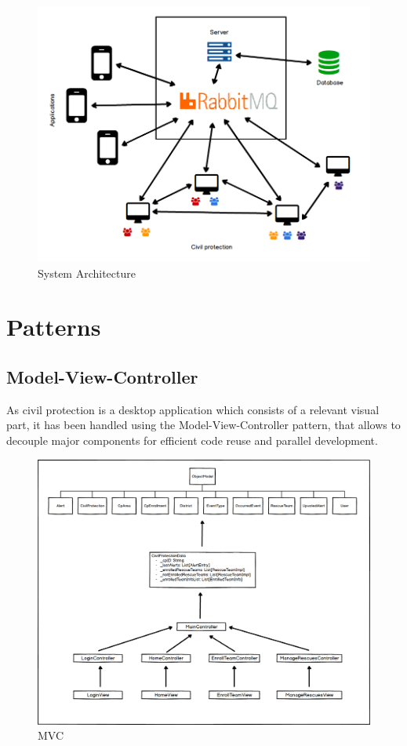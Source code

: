 \documentclass[a4paper,12pt]{report}
\begin{document}
\begin{figure}[ht]
\centering
\includegraphics[width=\textwidth]{figures/BaseArchitecture.png}
\caption{System Architecture}
\label{fig:ArchDesign}
\end{figure}

\section{Patterns}

\subsection{Model-View-Controller}
As civil protection is a desktop application which consists of a relevant visual part, it has been handled using the Model-View-Controller pattern, that allows to decouple major components for efficient code reuse and parallel development.

\begin{figure}[ht]
\centering
\includegraphics[width=\textwidth]{figures/MVC.png}
\caption{MVC}
\label{fig:MVC}
\end{figure}
\end{document}
